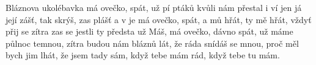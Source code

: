 \begin{TEXT}{Bláznova ukolébavka}
\SLOKA {} má ovečko,  spát, už pí ptáků \NL
kvůli nám přestal i ví jen  \NL
já  její zášť, tak  skrýš,\NL
zas  plášť a v  je 
\REFREN {} má ovečko,  spát,\NL
a mů hřát, ty mě  hřát,\NL
vždyť přij se  zítra zas  se \NL
jestli ty  předsta už 
\SLOKA Máš, má ovečko, dávno spát, už máme půlnoc temnou,\NL
zítra budou nám bláznů lát, že ráda snídáš se mnou,\NL
proč měl bych jim lhát, že jsem tady sám,\NL
když tebe mám rád, když tebe tu mám.
\REFRENHRAJ
\end{TEXT}
